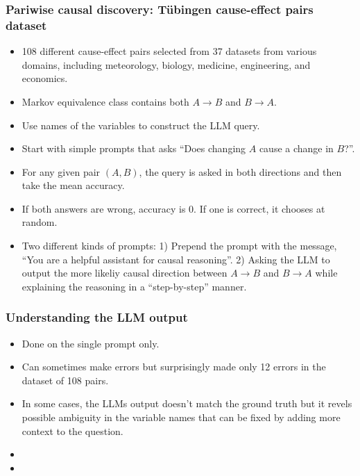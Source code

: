 \documentclass{beamer}
\begin{document}
\begin{frame}
	\frametitle{Pariwise causal discovery: T\"{u}bingen cause-effect pairs dataset}
	\begin{itemize}
		\item 108 different cause-effect pairs selected from 37 datasets from
			various domains, including meteorology, biology, medicine, 
			engineering, and economics.
		\item Markov equivalence class contains both $ A \rightarrow B $ and 
			$ B \rightarrow A $.
		\item Use names of the variables to construct the LLM query.
		\item Start with simple prompts that asks ``Does changing $ A $ cause a change in $ B $?''. 
		\item For any given pair $ (A , B) $, the query is asked in both
			directions and then take the mean accuracy.
		\item If both answers are wrong, accuracy is $0$. If one is correct, 
			it chooses at random.
		\item Two different kinds of prompts: 1) Prepend the prompt with the 
			message, ``You are a helpful assistant for causal reasoning''. 2)
			Asking the LLM to output the more likeliy causal direction
			between $ A \rightarrow B $ and $ B \rightarrow A $ while
			explaining the reasoning in a ``step-by-step'' manner.
	\end{itemize}
\end{frame}

\begin{frame}
	\frametitle{Understanding the LLM output}
	\begin{itemize}
		\item Done on the single prompt only.
		\item Can sometimes make errors but surprisingly made only
			12 errors in the dataset of 108 pairs.
		\item In some cases, the LLMs output doesn't match the ground truth
			but it revels possible ambiguity in the variable names that 
			can be fixed by adding more context to the question.
		\item {}
		\item {}
	\end{itemize}
\end{frame}
\end{document}
